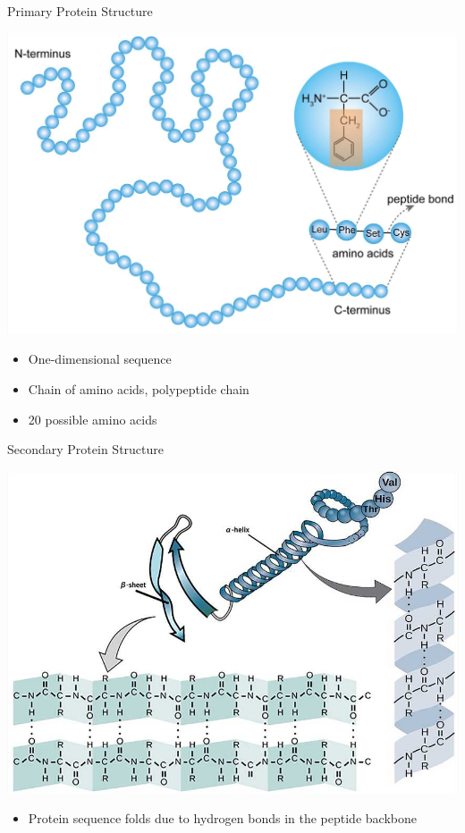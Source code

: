 \begin{frame}{Primary Protein Structure}
	\begin{center}
		\includegraphics[scale=0.22]{images/primary_protein_structure.jpg}
	\end{center}
	\begin{itemize}
		\item One-dimensional sequence
		\item Chain of amino acids, polypeptide chain
		\item 20 possible amino acids
	\end{itemize}
\end{frame}

\begin{frame}{Secondary Protein Structure}
	\begin{center}
		\includegraphics[scale=0.44]{images/secondary_protein_structure.jpg}
	\end{center}
	\begin{itemize}
		\item Protein sequence folds due to hydrogen bonds in the peptide backbone
	\end{itemize}
\end{frame}

